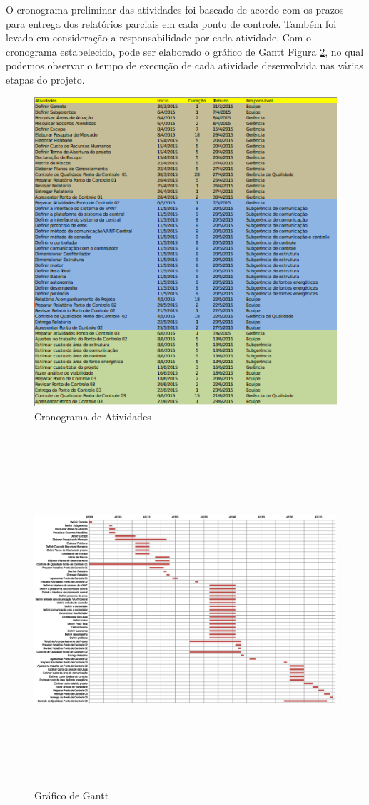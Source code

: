 
O cronograma preliminar das atividades foi baseado de acordo com os prazos para entrega dos relatórios parciais em cada ponto de controle. 
Também foi levado em consideração a responsabilidade por cada atividade.
Com o cronograma estabelecido, pode ser elaborado o gráfico de Gantt Figura \ref{fig:gantt}, no qual podemos observar o
tempo de execução de cada atividade desenvolvida nas várias etapas do projeto. 
% 
 \begin{figure}[h]
	\centering
		\includegraphics[keepaspectratio=true,scale=0.9]{figuras/cronograma.png}
	\caption{Cronograma de Atividades}
	\label{fig:cronograma}
\end{figure}
\pagebreak
 \begin{figure}[H]
	\flushleft
		\includegraphics[height=13cm,width=18cm]{figuras/gantt.eps}
	\caption{Gráfico de Gantt}
	\label{fig:gantt}
\end{figure}
